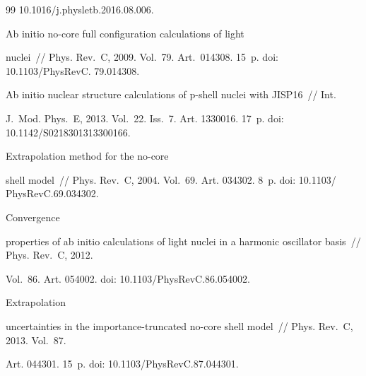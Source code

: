 {{\begin{thebibliography}{99}
10.1016\!/\!j.physletb.2016.08.006.




 Ab initio no-core full configuration calculations of light 


nuclei~/\!\!/ Phys. Rev.~C, 2009. Vol.~79. Art.~014308. 15~p. doi: 10.1103\!/\!PhysRevC. 79.014308. 




 Ab initio nuclear structure calculations of p-shell nuclei with JISP16~/\!\!/ Int. 


J.~Mod. Phys.~E, 2013. Vol.~22. Iss.~7. Art. 1330016. 17~p. doi: 10.1142\!/\!S0218301313300166.
















 Extrapolation method for the no-core 


shell model~/\!\!/ Phys. Rev.~C, 2004. Vol.~69. Art. 034302. 8~p. doi: 10.1103\!/ PhysRevC.69.034302. 







 Convergence 


properties of ab initio calculations of light nuclei in a harmonic oscillator basis~/\!\!/ Phys. Rev.~C, 2012. 


Vol.~86. Art. 054002. doi: 10.1103\!/\!PhysRevC.86.054002.










 Extrapolation 


uncertainties in the importance-truncated no-core shell model~/\!\!/ Phys. Rev.~C, 2013. Vol.~87. 


Art. 044301. 15~p. doi: 10.1103\!/\!PhysRevC.87.044301.








\end{thebibliography}}}
